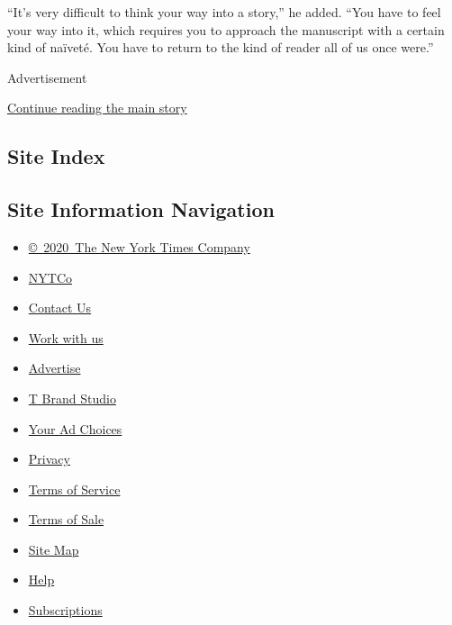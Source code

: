 ``It's very difficult to think your way into a story,'' he added. ``You
have to feel your way into it, which requires you to approach the
manuscript with a certain kind of naïveté. You have to return to the
kind of reader all of us once were.''

Advertisement

\protect\hyperlink{after-bottom}{Continue reading the main story}

\hypertarget{site-index}{%
\subsection{Site Index}\label{site-index}}

\hypertarget{site-information-navigation}{%
\subsection{Site Information
Navigation}\label{site-information-navigation}}

\begin{itemize}
\tightlist
\item
  \href{https://help.nytimes.com/hc/en-us/articles/115014792127-Copyright-notice}{©~2020~The
  New York Times Company}
\end{itemize}

\begin{itemize}
\tightlist
\item
  \href{https://www.nytco.com/}{NYTCo}
\item
  \href{https://help.nytimes.com/hc/en-us/articles/115015385887-Contact-Us}{Contact
  Us}
\item
  \href{https://www.nytco.com/careers/}{Work with us}
\item
  \href{https://nytmediakit.com/}{Advertise}
\item
  \href{http://www.tbrandstudio.com/}{T Brand Studio}
\item
  \href{https://www.nytimes.com/privacy/cookie-policy\#how-do-i-manage-trackers}{Your
  Ad Choices}
\item
  \href{https://www.nytimes.com/privacy}{Privacy}
\item
  \href{https://help.nytimes.com/hc/en-us/articles/115014893428-Terms-of-service}{Terms
  of Service}
\item
  \href{https://help.nytimes.com/hc/en-us/articles/115014893968-Terms-of-sale}{Terms
  of Sale}
\item
  \href{https://spiderbites.nytimes.com}{Site Map}
\item
  \href{https://help.nytimes.com/hc/en-us}{Help}
\item
  \href{https://www.nytimes.com/subscription?campaignId=37WXW}{Subscriptions}
\end{itemize}
